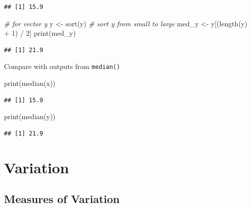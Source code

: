 \documentclass[
]{book}
\newenvironment{Shaded}{\begin{snugshade}}{\end{snugshade}}
\newcommand{\CommentTok}[1]{\textcolor[rgb]{0.56,0.35,0.01}{\textit{#1}}}
\newcommand{\DecValTok}[1]{\textcolor[rgb]{0.00,0.00,0.81}{#1}}
\newcommand{\FunctionTok}[1]{\textcolor[rgb]{0.00,0.00,0.00}{#1}}
\newcommand{\NormalTok}[1]{#1}
\newcommand{\OtherTok}[1]{\textcolor[rgb]{0.56,0.35,0.01}{#1}}
\newcommand{\SpecialCharTok}[1]{\textcolor[rgb]{0.00,0.00,0.00}{#1}}
\begin{document}
\begin{verbatim}
## [1] 15.9
\end{verbatim}

\begin{Shaded}
\begin{Highlighting}[]
\CommentTok{\# for vector y}
\NormalTok{y }\OtherTok{\textless{}{-}} \FunctionTok{sort}\NormalTok{(y) }\CommentTok{\# sort y from small to large}
\NormalTok{med\_y }\OtherTok{\textless{}{-}}\NormalTok{ y[(}\FunctionTok{length}\NormalTok{(y) }\SpecialCharTok{+} \DecValTok{1}\NormalTok{) }\SpecialCharTok{/} \DecValTok{2}\NormalTok{]}
\FunctionTok{print}\NormalTok{(med\_y)}
\end{Highlighting}
\end{Shaded}

\begin{verbatim}
## [1] 21.9
\end{verbatim}

Compare with outputs from \texttt{median()}

\begin{Shaded}
\begin{Highlighting}[]
\FunctionTok{print}\NormalTok{(}\FunctionTok{median}\NormalTok{(x))}
\end{Highlighting}
\end{Shaded}

\begin{verbatim}
## [1] 15.9
\end{verbatim}

\begin{Shaded}
\begin{Highlighting}[]
\FunctionTok{print}\NormalTok{(}\FunctionTok{median}\NormalTok{(y))}
\end{Highlighting}
\end{Shaded}

\begin{verbatim}
## [1] 21.9
\end{verbatim}

\hypertarget{variation}{%
\section{Variation}\label{variation}}

\hypertarget{measures-of-variation}{%
\subsection{Measures of Variation}\label{measures-of-variation}}
\end{document}
